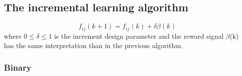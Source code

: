 \newpage
\subsection{The incremental learning algorithm}
$$f_{ij} (k+1)   = f_{ij} (k) + \delta \beta(k)$$
where $0 \leq \delta \leq 1$ is the increment  design parameter and the reward signal $\beta$(k) has the same interpretation than in the previous algorithm.

\subsubsection{Binary}

\begin{figure}[ht]
\centering
{}
\label{fig:fig1}
\end{figure}

